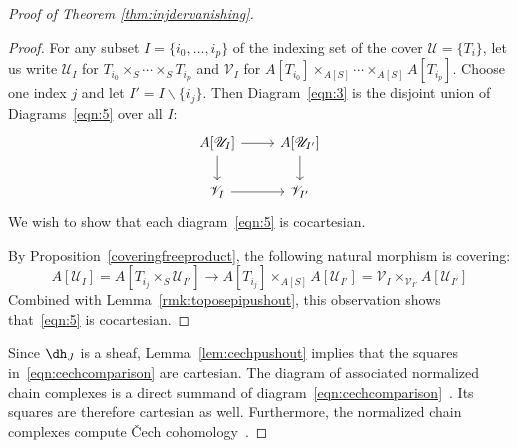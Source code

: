 \documentclass[11pt,reqno]{amsart}
\theoremstyle{definition}
\newcommand{\dd}[1]{\dh_{#1}}
\begin{document}
\begin{proof}[Proof of Theorem \ref{thm:injdervanishing}]
\begin{proof}
	For any subset $I = \{ i_0, \ldots, i_p \}$ of the indexing set of the cover $\mathscr U = \{ T_i \}$, let us write $\mathscr U_I$ for $T_{i_0} \mathop\times_S \cdots \mathop\times_S T_{i_p}$ and $\mathscr V_I$ for $A[T_{i_0}] \mathop\times_{A[S]} \cdots \mathop\times_{A[S]} A[T_{i_p}]$.  Choose one index $j$ and let $I' = I \smallsetminus \{ i_j \}$.  Then Diagram~\eqref{eqn:3} is the disjoint union of Diagrams~\eqref{eqn:5} over all $I$: 
	\begin{equation} \label{eqn:5}
	\begin{tikzcd}
		A[\mathscr U_I] \ar[r] \ar[d] & A[\mathscr U_{I'}] \ar[d] \\
		\mathscr V_I \ar[r] & \mathscr V_{I'}
	\end{tikzcd}
	\end{equation}
	We wish to show that each diagram~\eqref{eqn:5} is cocartesian.

	By Proposition~\ref{coveringfreeproduct}, the following natural morphism is covering:
	\begin{equation*}
		A[\mathscr U_I] = A[T_{i_j} \mathop\times_S \mathscr U_{I'}] \to A[T_{i_j}] \mathop\times_{A[S]} A[\mathscr U_{I'}] = \mathscr V_I \mathop\times_{\mathscr V_{I'}} A[\mathscr U_{I'}]
	\end{equation*}
	Combined with Lemma~\ref{rmk:toposepipushout}, this observation shows that~\eqref{eqn:5} is cocartesian.
\end{proof}

Since $\dd{J}$ is a sheaf, Lemma~\ref{lem:cechpushout} implies that the squares in~\eqref{eqn:cechcomparison} are cartesian.  The diagram of associated normalized chain complexes is a direct summand of diagram~\eqref{eqn:cechcomparison}~\cite[\href{https://stacks.math.columbia.edu/tag/019I}{Tag 019I}, (3)]{stacks-project}.  Its squares are therefore cartesian as well.  Furthermore, the normalized chain complexes compute \v Cech cohomology~\cite[\href{https://stacks.math.columbia.edu/tag/019I}{Tag 019I}, (5)]{stacks-project}.


\end{proof}
\end{document}
